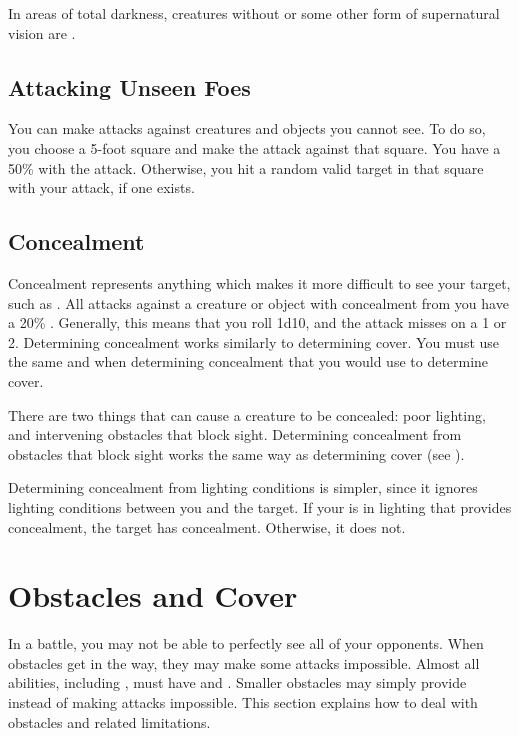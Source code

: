     In areas of total darkness, creatures without  or some other form of supernatural vision are \blinded.

    \subsection{Attacking Unseen Foes}
        You can make  attacks against creatures and objects you cannot see.
        To do so, you choose a 5-foot square and make the attack against that square.
        You have a 50\%  with the attack.
        Otherwise, you hit a random valid target in that square with your attack, if one exists.

    \subsection{Concealment}\label{Concealment}
        Concealment represents anything which makes it more difficult to see your target, such as .
        All  attacks against a creature or object with concealment from you have a 20\% .
        Generally, this means that you roll 1d10, and the attack misses on a 1 or 2.
        Determining concealment works similarly to determining cover.
        You must use the same  and  when determining concealment that you would use to determine cover.

         There are two things that can cause a creature to be concealed: poor lighting, and intervening obstacles that block sight.
        Determining concealment from obstacles that block sight works the same way as determining cover (see ).

        Determining concealment from lighting conditions is simpler, since it ignores lighting conditions between you and the target.
        If your  is in lighting that provides concealment, the target has concealment.
        Otherwise, it does not.

\section{Obstacles and Cover}\label{Obstacles and Cover}
    In a battle, you may not be able to perfectly see all of your opponents.
    When obstacles get in the way, they may make some attacks impossible.
    Almost all abilities, including , must have  and .
    Smaller obstacles may simply provide  instead of making attacks impossible.
    This section explains how to deal with obstacles and related limitations.

